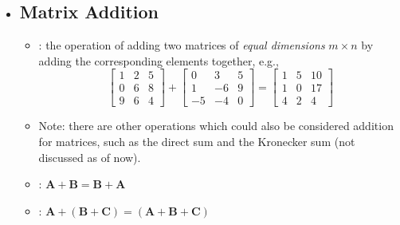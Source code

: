 \begin{itemize}
  \item []
  
  \subsection{Matrix Addition}\label{Matrix Addition and Subtraction}
  \begin{itemize}
    \item {}: the operation of adding two matrices of \emph{equal dimensions} \(m \times n\) by adding the corresponding elements together, e.g.,
    \[%
    \begin{bmatrix}
    1 & 2 & 5 \\
    0 & 6 & 8 \\
    9 & 6 & 4 
    \end{bmatrix} +
    \begin{bmatrix}
      0 & 3 & 5 \\
      1 & -6 & 9 \\
      -5 & -4 & 0 
    \end{bmatrix} 
    = 
    \begin{bmatrix}
    1 & 5 & 10 \\
    1 & 0 & 17 \\
    4 & 2 & 4 
    \end{bmatrix}
    \]%
    \item Note: there are other operations which could also be considered addition for matrices, such as the direct sum and the Kronecker sum (not discussed as of now).
    \item {}: \(\bm{A}+\bm{B} = \bm{B} + \bm{A}\)
    \item {}: \(\bm{A} + (\bm{B}+\bm{C}) = (\bm{A}+\bm{B}+ \bm{C})\)
  \end{itemize}


\end{itemize}
